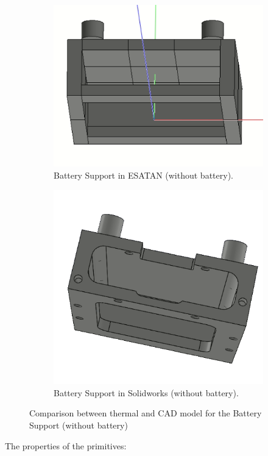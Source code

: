 \begin{figure}[H]
    \centering
    \begin{subfigure}{.5\textwidth}
      \centering
      \includegraphics[width=.6\linewidth]{res/img/5_simulationanalisys/Comparisons/ESATAN/BatterySupport_raw.PNG}
      \caption{Battery Support in ESATAN (without battery).}
      \label{fig:batterysupportraw}
    \end{subfigure}%
    \begin{subfigure}{.5\textwidth}
      \centering
      \includegraphics[width=.5\linewidth]{res/img/5_simulationanalisys/Comparisons/SLDW/BatterySupport_Raw_Solid.PNG}
      \caption{Battery Support in Solidworks (without battery).}
      \label{fig:batterysupportrawsolid}
    \end{subfigure}
    \caption{Comparison between thermal and CAD model for the Battery Support (without battery)}
    \label{fig:batterysupportrawim}
\end{figure}

The properties of the primitives:

